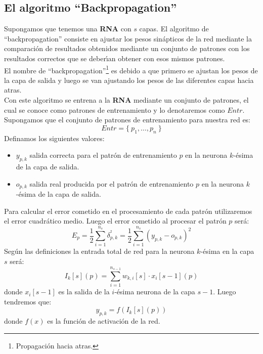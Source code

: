 %
%

\subsection{El algoritmo ``Backpropagation''}

Supongamos que tenemos una \textbf{RNA} con $s$ capas. El algoritmo de
``backpropagation'' consiste en ajustar los pesos sin\'apticos de la red
mediante la comparaci\'on de resultados obtenidos mediante un conjunto de
patrones con los resultados correctos que se deber\'{\i}an obtener con esos
mismos patrones.\\

El nombre de ``backpropagation''\footnote{Propagaci\'on hacia atras.} es debido
a que primero se ajustan los pesos de la capa de salida y luego se van ajustando
los pesos de las diferentes capas hacia atras.\\

Con este algoritmo se entrena a la \textbf{RNA} mediante un conjunto de
patrones, el cual se conoce como patrones de entrenamiento y lo denotaremos como
$Entr$.\\

Supongamos que el conjunto de patrones de entrenamiento para nuestra red es:
\begin{displaymath}
Entr = \{\ p_1,\dots,p_n\ \}
\end{displaymath}
Definamos los siguientes valores:
\begin{itemize}
\item $y_{p,k}$ salida correcta para el patr\'on de entrenamiento $p$ en la
neurona $k$-\'esima de la capa de salida.
\item $o_{p,k}$ salida real producida por el patr\'on de entrenamiento $p$ en
la neurona $k$-\'esima de la capa de salida.
\end{itemize}
Para calcular el error cometido en el procesamiento de cada patr\'on
utilizaremos el error cuadr\'atico medio. Luego el error cometido al procesar
el patr\'on $p$ ser\'a:
\begin{equation}\label{eq:ECM}
E_p = \frac{1}{2} \sum_{i=1}^{n_s} \delta_{p,k}^{^2} = \frac{1}{2}
\sum_{i=1}^{n_s} (y_{p,k}-o_{p,k})^2
\end{equation}
%
\newpage
%
Seg\'un las definiciones la entrada total de red para la neurona $k$-\'esima en
la capa $s$ ser\'a:
\begin{equation}\label{eq:ENTRADARED}
I_{k}[s](p) = \sum_{i=1}^{n_{s-1}} w_{k,i}[s]\cdot x_i[s-1](p)
\end{equation}
donde $x_i[s-1]$ es la salida de la $i$-\'esima neurona de la capa $s-1$. Luego
tendremos que:
\begin{equation}\label{eq:SALIDACORRECTA}
y_{p,k} = f(I_k[s](p))
\end{equation}
donde $f(x)$ es la funci\'on de activaci\'on de la red.\\

